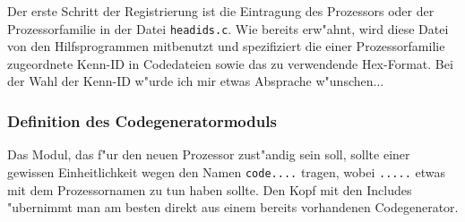 \documentclass[12pt,a4paper,twoside]{report}
\newcommand{\tty}[1]{{\tt #1}}
\begin{document}
{Der erste Schritt der Registrierung ist die Eintragung des Prozessors oder
der Prozessorfamilie in der Datei {\tt headids.c}.  Wie bereits erw"ahnt,
wird diese Datei von den Hilfsprogrammen mitbenutzt und spezifiziert die
einer Prozessorfamilie zugeordnete Kenn-ID in Codedateien sowie das zu
verwendende Hex-Format.  Bei der Wahl der Kenn-ID w"urde ich mir etwas
Absprache w"unschen...

\subsubsection{Definition des Codegeneratormoduls}

Das Modul, das f"ur den neuen Prozessor zust"andig sein soll, sollte einer
gewissen Einheitlichkeit wegen den Namen \tty{code....} tragen, wobei
\tty{.....} etwas mit dem Prozessornamen zu tun haben sollte.  Den Kopf
mit den Includes "ubernimmt man am besten direkt aus einem bereits
vorhandenen Codegenerator.

}
\end{document}
